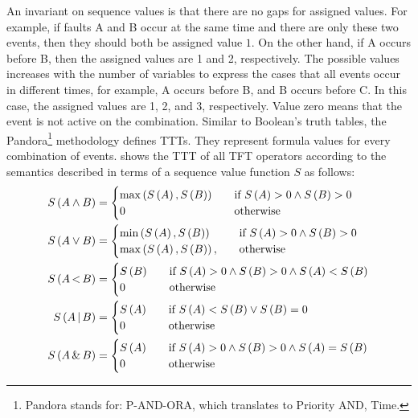 \documentclass[12pt,openright,twoside,a4paper,oldfontcommands,english,brazil,final]{abntex2}
\theoremstyle{theo}
\def\pandora{Pandora\footnote{Pandora stands for: P-AND-ORA, which translates to Priority AND, Time.}%
  \gdef\pandora{Pandora\xspace}%
  \xspace}
\newcommand{\parsin}[1]{\ensuremath\left( #1 \right)}
\def\pand{\ensuremath\operatorname{<}}
\def\por{\ensuremath\operatorname{|}}
\def\sand{\ensuremath\operatorname{\&}}
\begin{document}
An invariant on sequence values is that there are no gaps for assigned values.
For example, if faults A and B occur at the same time and there are only these two events, then they should both be assigned value $1$.
On the other hand, if A occurs before B, then the assigned values are 1 and 2, respectively.
The possible values increases with the number of variables to express the cases that all events occur in different times, for example, A occurs before B, and B occurs before C. 
In this case, the assigned values are 1, 2, and 3, respectively.
Value zero means that the event is not active on the combination.
Similar to Boolean's truth tables, the \pandora methodology defines \acp{TTT}.
They represent formula values for every combination of events.
 shows the \ac{TTT} of all \ac{TFT} operators according to the semantics described in terms of a sequence value function $S$ as follows:
%
\begin{subequations}
  \begin{align}
    S\parsin{A \land B} &=
    \begin{cases}
      \max \parsin{S\parsin{A}, S\parsin{B}} &\quad \text{if }S \parsin{A} > 0 \land S \parsin{B} > 0\\
      0 &\quad\text{otherwise}\\
    \end{cases}\\
%
    S\parsin{A \lor B} &=
    \begin{cases}
      \min \parsin{S\parsin{A}, S\parsin{B}} &\quad \text{if }S \parsin{A} > 0 \land S \parsin{B} > 0\\
      \max \parsin{S\parsin{A}, S\parsin{B}}, &\quad\text{otherwise}\\
    \end{cases}\\
%
    S\parsin{A \pand B} &=
    \begin{cases}
      S\parsin{B} &\quad \text{if }S \parsin{A} > 0 \land S \parsin{B} > 0 \land S \parsin{A} < S \parsin{B}\\
      0 &\quad\text{otherwise}\\
    \end{cases}\\
%
    S\parsin{A \por B} &=
    \begin{cases}
      S\parsin{A} &\quad \text{if } S \parsin{A} < S \parsin{B} \lor S \parsin{B} = 0\\
      0 &\quad\text{otherwise}\\
    \end{cases}\\
%
    S\parsin{A \sand B} &=
    \begin{cases}
      S\parsin{A} &\quad \text{if }S \parsin{A} > 0 \land S \parsin{B} > 0 \land S \parsin{A} = S \parsin{B}\\
      0 &\quad\text{otherwise}\\
    \end{cases}
  \end{align}
\end{subequations}
\end{document}
